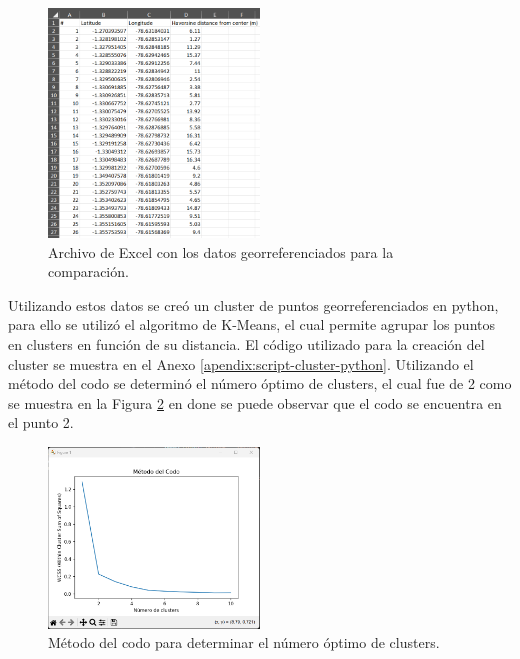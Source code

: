 \begin{figure}[H]
    \centering
    \includegraphics[width=0.5\textwidth]{chapters/III-resultados-y-discusion/resources/images/archivo-excel-georreferenciacion.png}
    \caption{Archivo de Excel con los datos georreferenciados para la comparación.}
    \label{fig:archivo-excel-georreferenciacion}
\end{figure}

Utilizando estos datos se creó un cluster de puntos georreferenciados en python, para ello se utilizó el algoritmo de K-Means, el cual
permite agrupar los puntos en clusters en función de su distancia. El código utilizado para la creación del cluster se muestra en el
Anexo \ref{apendix:script-cluster-python}. Utilizando el método del codo se determinó el número óptimo de clusters, el cual fue de 2 como
se muestra en la Figura \ref{fig:metodo-del-codo} en done se puede observar que el codo se encuentra en el punto 2.

%     

\begin{figure}[H]
    \centering
    \includegraphics[width=0.5\textwidth]{chapters/III-resultados-y-discusion/resources/images/metodo-del-codo.png}
    \caption{Método del codo para determinar el número óptimo de clusters.}
    \label{fig:metodo-del-codo}
\end{figure}

